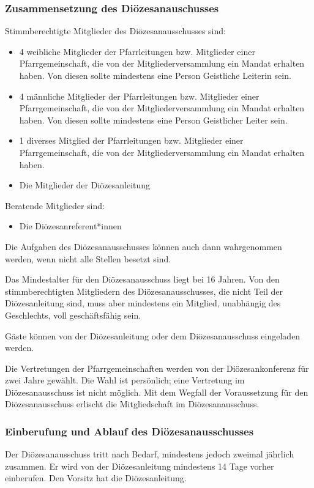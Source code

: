 \documentclass[12pt]{report}
\begin{document}
\begin{flushleft}
\subsubsection{Zusammensetzung des Diözesanauschusses}
Stimmberechtigte Mitglieder des Diözesanausschusses sind:
\begin{itemize}
  \item 4 weibliche Mitglieder der Pfarrleitungen bzw. Mitglieder einer Pfarrgemeinschaft, die von der
        Mitgliederversammlung ein Mandat erhalten haben. Von diesen sollte mindestens eine Person
        Geistliche Leiterin sein.
  \item 4 männliche Mitglieder der Pfarrleitungen bzw. Mitglieder einer Pfarrgemeinschaft, die von
        der Mitgliederversammlung ein Mandat erhalten haben. Von diesen sollte mindestens eine
        Person Geistlicher Leiter sein.
  \item 1 diverses Mitglied der Pfarrleitungen bzw. Mitglieder einer Pfarrgemeinschaft, die von
        der Mitgliederversammlung ein Mandat erhalten haben.
  \item Die Mitglieder der Diözesanleitung
\end{itemize}

Beratende Mitglieder sind:
\begin{itemize}
  \item Die Diözesanreferent*innen
\end{itemize}

Die Aufgaben des Diözesanausschusses können auch dann wahrgenommen werden, wenn nicht
alle Stellen besetzt sind.

Das Mindestalter für den Diözesanausschuss liegt bei 16 Jahren. Von den stimmberechtigten Mitgliedern
des Diözesanausschusses, die nicht Teil der Diözesanleitung sind, muss aber mindestens
ein Mitglied, unabhängig des Geschlechts, voll geschäftsfähig sein.

Gäste können von der Diözesanleitung oder dem Diözesanausschuss eingeladen werden.

Die Vertretungen der Pfarrgemeinschaften werden von der Diözesankonferenz für zwei Jahre
gewählt. Die Wahl ist persönlich; eine Vertretung im Diözesanausschuss ist nicht möglich. Mit
dem Wegfall der Voraussetzung für den Diözesanausschuss erlischt die Mitgliedschaft im Diözesanausschuss.

\subsubsection{Einberufung und Ablauf des Diözesanausschusses}
Der Diözesanausschuss tritt nach Bedarf, mindestens jedoch zweimal jährlich zusammen. Er wird
von der Diözesanleitung mindestens 14 Tage vorher einberufen. Den Vorsitz hat die Diözesanleitung.


\end{flushleft}
\end{document}
